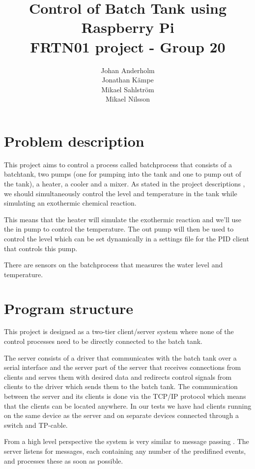 \documentclass{article}
\title{Control of Batch Tank using Raspberry Pi \\ FRTN01 project - Group 20}
\author{Johan Anderholm \\ Jonathan Kämpe \\ Mikael Sahlström \\ Mikael Nilsson}
\begin{document}
\maketitle
\newpage
\tableofcontents
\newpage
\section{Problem description}
This project aims to control a process called batchprocess that consists of a
batchtank, two pumps (one for pumping into the tank and one to pump out of the
tank), a heater, a cooler and a mixer. As stated in the project descriptions
\cite[p.~6]{project12}, we should simultaneously control the level and
temperature in the tank while simulating an exothermic chemical reaction.

This means that the heater will simulate the exothermic reaction and we'll use
the in pump to control the temperature. The out pump will then be used
to control the level which can be set dynamically in a settings file for the PID client that controls this pump.

There are sensors on the batchprocess that measures the water level and temperature.

\section{Program structure}
This project is designed as a two-tier client/server system 
\cite[p.~6]{clientserver} where none of the control processes need to be directly
connected to the batch tank.

The server consists of a driver that communicates with the batch tank over a
serial interface and the server part of the server that receives connections from
clients and serves them with desired data and redirects control signals from
clients to the driver which sends them to the batch tank. The communication
between the server and its clients is done via the TCP/IP protocol which means
that the clients can be located anywhere. In our tests we have had clients
running on the same device as the server and on separate devices connected
through a switch and TP-cable.

From a high level perspective the system is very similar to message
passing \cite[p.~71]{rtcs}. The server listens for messages, each
containing any number of the predifined events, and processes these as
soon as possible.
\end{document}
